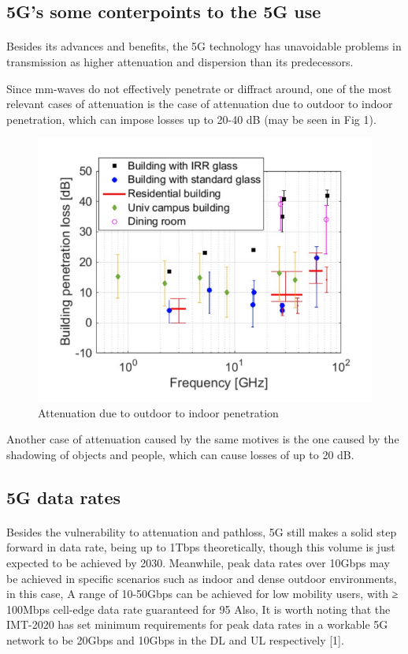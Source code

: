 \documentclass[10pt,journal,compsoc]{IEEEtran}
\begin{document}
\subsection*{5G's some conterpoints to the 5G use}
\paragraph{}
Besides its advances and benefits, the 5G technology has unavoidable problems in transmission as higher attenuation and dispersion than its predecessors.\par
Since mm-waves do not effectively penetrate or diffract around, one of the most relevant cases of attenuation is the case of attenuation due to outdoor to indoor penetration, which can impose losses up to 20-40 dB (may be seen in Fig 1).\par
\begin{figure}[h]
\centering
\includegraphics[width=\textwidth]{Fig1}
\caption{Attenuation due to outdoor to indoor penetration}
\end{figure}
Another case of attenuation caused by the same motives is the one caused by the shadowing of objects and people, which can cause losses of up to 20 dB.\par
\subsection*{5G data rates}
\paragraph{}
Besides the vulnerability to attenuation and pathloss, 5G still makes a solid step forward in data rate, being up to 1Tbps theoretically, though this volume is just expected to be achieved by 2030. Meanwhile, peak data rates over 10Gbps may be achieved in specific scenarios such as indoor and dense outdoor environments, in this case, A range of 10-50Gbps can be achieved for low mobility users, with ≥ 100Mbps cell-edge data rate guaranteed for 95%
Also, It is worth noting that the IMT-2020 has set minimum requirements for peak data rates in a workable 5G network to be 20Gbps and 10Gbps in the DL and UL respectively [1].\par
\end{document}
